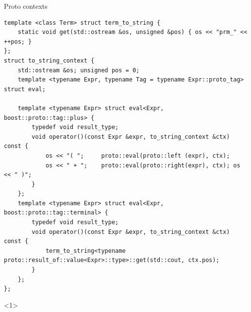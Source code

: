 \documentclass[@BEAMER_OPTIONS@]{beamer}
\begin{document}
\begin{frame}[fragile]{Proto contexts}
    \begin{exampleblock}{}
        \begin{adjustbox}{width=0.85\textwidth, height=\textheight, keepaspectratio}
            \begin{minipage}{\textwidth}
                \begin{lstlisting}
template <class Term> struct term_to_string {
    static void get(std::ostream &os, unsigned &pos) { os << "prm_" << ++pos; }
};
struct to_string_context {
    std::ostream &os; unsigned pos = 0;
    template <typename Expr, typename Tag = typename Expr::proto_tag> struct eval;

    template <typename Expr> struct eval<Expr, boost::proto::tag::plus> {
        typedef void result_type;
        void operator()(const Expr &expr, to_string_context &ctx) const {
            os << "( ";     proto::eval(proto::left (expr), ctx);
            os << " + ";    proto::eval(proto::right(expr), ctx); os << " )";
        }
    };
    template <typename Expr> struct eval<Expr, boost::proto::tag::terminal> {
        typedef void result_type;
        void operator()(const Expr &expr, to_string_context &ctx) const {
            term_to_string<typename proto::result_of::value<Expr>::type>::get(std::cout, ctx.pos);
        }
    };
};
                \end{lstlisting}
            \end{minipage}
        \end{adjustbox}
    \end{exampleblock}
    \begin{onlyenv}<1>

\end{onlyenv}
\end{frame}
\end{document}
